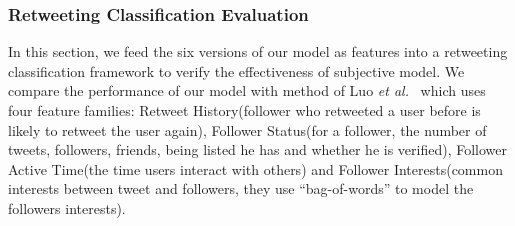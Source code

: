 \documentclass{acm_proc_article-sp}
\begin{document}
\subsubsection{Retweeting Classification Evaluation}
\label{classifiction}
In this section, we feed the six versions of our model as features into a retweeting classification framework to verify the effectiveness of subjective model. 
We compare the performance of our model with method of Luo \emph{et al.}~\cite{Luo:2013RMF} which uses four feature families: Retweet History(follower who retweeted a user before is likely to retweet the user again), Follower Status(for a follower, the number of tweets, followers, friends, being listed he has and whether he is verified), Follower Active Time(the time users interact with others) and Follower Interests(common interests between tweet and followers, they use ``bag-of-words'' to model the followers interests).
\end{document}
